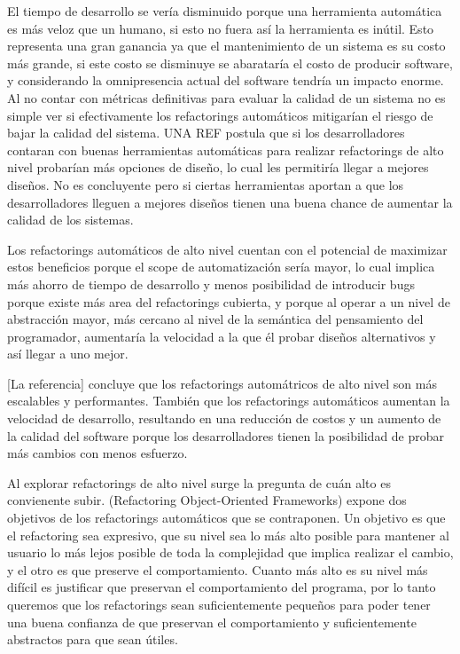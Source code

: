 El tiempo de desarrollo se vería disminuido porque una herramienta automática es más veloz que un
humano, si esto no fuera así la herramienta es inútil. Esto representa una gran ganancia ya que el
mantenimiento de un sistema es su costo más grande, si este costo se disminuye se abarataría el
costo de producir software, y considerando la omnipresencia actual del software tendría un impacto
enorme. Al no contar con métricas definitivas para evaluar la calidad de un sistema no es simple ver
si efectivamente los refactorings automáticos mitigarían el riesgo de bajar la calidad del sistema.
UNA REF postula que si los desarrolladores contaran con buenas herramientas automáticas para
realizar refactorings de alto nivel probarían más opciones de diseño, lo cual les permitiría llegar
a mejores diseños. No es concluyente pero si ciertas herramientas aportan a que los desarrolladores
lleguen a mejores diseños tienen una buena chance de aumentar la calidad de los sistemas.

Los refactorings automáticos de alto nivel cuentan con el potencial de maximizar estos beneficios
porque el scope de automatización sería mayor, lo cual implica más ahorro de tiempo de desarrollo y
menos posibilidad de introducir bugs porque existe más area del refactorings cubierta, y porque al
operar a un nivel de abstracción mayor, más cercano al nivel de la semántica del pensamiento del
programador, aumentaría la velocidad a la que él probar diseños alternativos y así llegar a uno
mejor.

[La referencia] concluye que los refactorings automátricos de alto nivel son más escalables y performantes.
También que los refactorings automáticos aumentan la velocidad de desarrollo, resultando en una reducción de
costos y un aumento de la calidad del software porque los desarrolladores tienen la posibilidad de
probar más cambios con menos esfuerzo.

Al explorar refactorings de alto nivel surge la pregunta de cuán alto es convienente subir.
(Refactoring Object-Oriented Frameworks) expone dos objetivos de los refactorings automáticos que se
contraponen. Un objetivo es que el refactoring sea expresivo, que su nivel sea lo más alto posible
para mantener al usuario lo más lejos posible de toda la complejidad que implica realizar el cambio,
y el otro es que preserve el comportamiento. Cuanto más alto es su nivel más difícil es justificar que
preservan el comportamiento del programa, por lo tanto queremos que los refactorings sean
suficientemente pequeños para poder tener una buena confianza de que preservan el comportamiento y
suficientemente abstractos para que sean útiles.  

